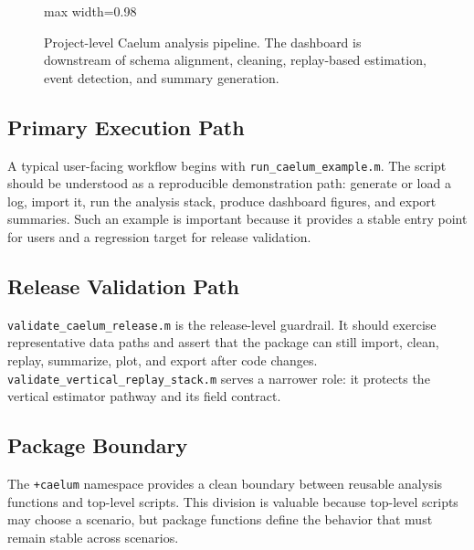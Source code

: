 \documentclass[colorlinks,upint,subscriptcorrection,varvw,hyphenate,balance]{asmeconf}
\newcommand{\code}[1]{\texttt{\allowbreak#1}}
\newcommand{\pkg}{\code{+caelum}}
\begin{document}
\begin{figure}[t]
\begin{adjustbox}{max width=0.98\textwidth}
\end{adjustbox}
\caption{Project-level Caelum analysis pipeline. The dashboard is downstream of schema alignment, cleaning, replay-based estimation, event detection, and summary generation.}
\label{fig:pipeline}
\end{figure}

\subsection{Primary Execution Path}
A typical user-facing workflow begins with \code{run\_caelum\_example.m}. The script should be understood as a reproducible demonstration path: generate or load a log, import it, run the analysis stack, produce dashboard figures, and export summaries. Such an example is important because it provides a stable entry point for users and a regression target for release validation.

\subsection{Release Validation Path}
\code{validate\_caelum\_release.m} is the release-level guardrail. It should exercise representative data paths and assert that the package can still import, clean, replay, summarize, plot, and export after code changes. \code{validate\_vertical\_replay\_stack.m} serves a narrower role: it protects the vertical estimator pathway and its field contract.

\subsection{Package Boundary}
The \pkg{} namespace provides a clean boundary between reusable analysis functions and top-level scripts. This division is valuable because top-level scripts may choose a scenario, but package functions define the behavior that must remain stable across scenarios.

\end{document}
